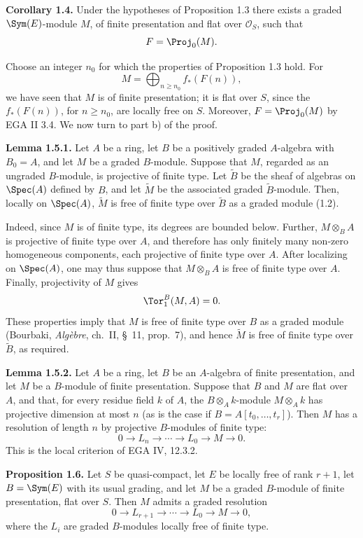 \textbf{Corollary 1.4.} Under the hypotheses of Proposition 1.3 there exists a graded \(\Sym(E)\)-module \(M\), of finite presentation and flat over \(\mathcal O_S\), such that
\[
  F=\Proj_0(M).
\]

Choose an integer \(n_0\) for which the properties of Proposition 1.3 hold. For
\[
 M=\bigoplus_{n\ge n_0}f_*(F(n)),
\]
we have seen that \(M\) is of finite presentation; it is flat over \(S\), since the \(f_*(F(n))\), for \(n\ge n_0\), are locally free on \(S\). Moreover, \(F=\Proj_0(M)\) by EGA II 3.4. We now turn to part b) of the proof.

\textbf{Lemma 1.5.1.} Let \(A\) be a ring, let \(B\) be a positively graded \(A\)-algebra with \(B_0=A\), and let \(M\) be a graded \(B\)-module. Suppose that \(M\), regarded as an ungraded \(B\)-module, is projective of finite type. Let \(\widetilde B\) be the sheaf of algebras on \(\Spec(A)\) defined by \(B\), and let \(\widetilde M\) be the associated graded \(\widetilde B\)-module. Then, locally on \(\Spec(A)\), \(\widetilde M\) is free of finite type over \(\widetilde B\) as a graded module (1.2).

Indeed, since \(M\) is of finite type, its degrees are bounded below. Further, \(M\otimes_B A\) is projective of finite type over \(A\), and therefore has only finitely many non-zero homogeneous components, each projective of finite type over \(A\). After localizing on \(\Spec(A)\), one may thus suppose that \(M\otimes_B A\) is free of finite type over \(A\). Finally, projectivity of \(M\) gives
\[
 \Tor_1^B(M,A)=0.
\]
These properties imply that \(M\) is free of finite type over \(B\) as a graded module (Bourbaki, \emph{Algèbre}, ch.~II, \S~11, prop.~7), and hence \(\widetilde M\) is free of finite type over \(\widetilde B\), as required.

\textbf{Lemma 1.5.2.} Let \(A\) be a ring, let \(B\) be an \(A\)-algebra of finite presentation, and let \(M\) be a \(B\)-module of finite presentation. Suppose that \(B\) and \(M\) are flat over \(A\), and that, for every residue field \(k\) of \(A\), the \(B\otimes_A k\)-module \(M\otimes_A k\) has projective dimension at most \(n\) (as is the case if \(B=A[t_0,\ldots,t_r]\)). Then \(M\) has a resolution of length \(n\) by projective \(B\)-modules of finite type:
\[
  0\longrightarrow L_n\longrightarrow\cdots\longrightarrow L_0\longrightarrow M\longrightarrow 0.
\]
This is the local criterion of EGA IV, 12.3.2.

\textbf{Proposition 1.6.} Let \(S\) be quasi-compact, let \(E\) be locally free of rank \(r+1\), let \(B=\Sym(E)\) with its usual grading, and let \(M\) be a graded \(B\)-module of finite presentation, flat over \(S\). Then \(M\) admits a graded resolution
\[
  0\longrightarrow L_{r+1}\longrightarrow\cdots\longrightarrow L_0\longrightarrow M\longrightarrow 0,
\]
where the \(L_i\) are graded \(B\)-modules locally free of finite type.


